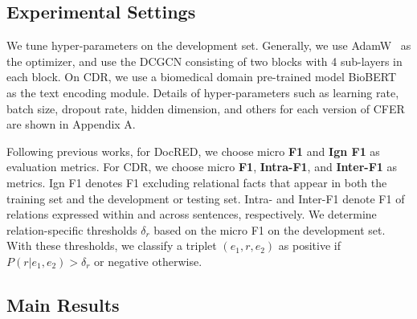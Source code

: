 \documentclass{article}
\newcommand{\citep}{\cite}
\begin{document}
\subsection{Experimental Settings}
We tune hyper-parameters on the development set. 
Generally, we use AdamW~\citep{adamw} as the optimizer, and use the DCGCN consisting of two blocks with 4 sub-layers in each block. 
On CDR, we use a biomedical domain pre-trained model BioBERT~\citep{biobert} as the text encoding module. 
Details of hyper-parameters such as learning rate, batch size, dropout rate, hidden dimension, and others for each version of CFER are shown in Appendix A. 

Following previous works, for DocRED, we choose micro \textbf{F1} and \textbf{Ign F1} as evaluation metrics. 
For CDR, we choose micro \textbf{F1}, \textbf{Intra-F1}, and \textbf{Inter-F1} as metrics. 
Ign F1 denotes F1 excluding relational facts that appear in both the training set and the development or testing set. 
Intra- and Inter-F1 denote F1 of relations expressed within and across sentences, respectively. 
We determine relation-specific thresholds $\delta_r$ based on the micro F1 on the development set. 
With these thresholds, we classify a triplet $(e_1, r, e_2)$ as positive if $P(r|e_1, e_2) > \delta_r$ or negative otherwise. 

\subsection{Main Results}
\end{document}

